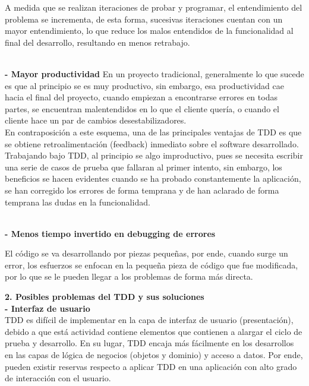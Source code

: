 \begin{flushleft}
\begin{itemize}
A medida que se realizan iteraciones de probar y programar, el entendimiento del problema se incrementa, de esta forma, sucesivas iteraciones cuentan con un mayor entendimiento, lo que reduce los malos entendidos de la funcionalidad al final del desarrollo, resultando en menos retrabajo. 

\textbf{}\\
\textbf{- Mayor productividad  }
En un proyecto tradicional, generalmente lo que sucede es que al principio se es muy productivo, sin embargo, esa productividad cae hacia el final del proyecto, cuando empiezan a encontrarse errores en todas partes, se encuentran malentendidos en lo que el cliente quería, o cuando el cliente hace un par de cambios desestabilizadores. \textbf{}\\

En contraposición a este esquema, una de las principales ventajas de TDD es que se obtiene retroalimentación (feedback) inmediato sobre el software desarrollado. \textbf{}\\

Trabajando bajo TDD, al principio se algo improductivo, pues se necesita escribir una serie de casos de prueba que fallaran al primer intento, sin embargo, los beneficios se hacen evidentes cuando se ha probado constantemente la aplicación, se han corregido los errores de forma temprana y de han aclarado de forma temprana las dudas en la funcionalidad.

\textbf{}\\
\textbf{- Menos tiempo invertido en debugging de errores }

El código se va desarrollando por piezas pequeñas, por ende, cuando surge un error, los esfuerzos se enfocan en la pequeña pieza de código que fue modificada, por lo que se le pueden llegar a los problemas de forma más directa. 

\textbf{2.   Posibles problemas del TDD y sus soluciones }
\textbf{}\\

\textbf{- Interfaz de usuario}
\textbf{}\\
TDD es difícil de implementar en la capa de interfaz de usuario (presentación), debido a que está actividad contiene elementos que contienen a alargar el ciclo de prueba y desarrollo. En su lugar, TDD encaja más fácilmente en los desarrollos en las capas de lógica de negocios (objetos y dominio) y acceso a datos. Por ende, pueden existir reservas respecto a aplicar TDD en una aplicación con alto grado de interacción con el usuario. 


\end{itemize}
\end{flushleft}
